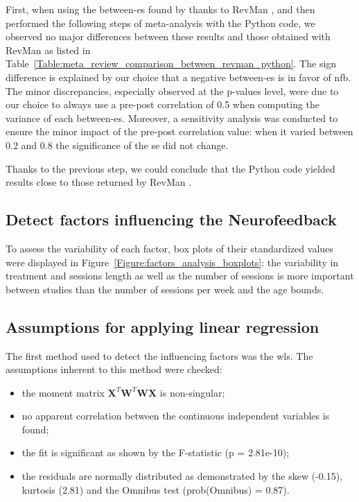 \documentclass[12pt,a4paper,english]{article}
\begin{document}
First, when using the between-\gls{es} found by \citet{Cortese2016} thanks to RevMan \citep{RevMan}, and then performed the following steps 
of meta-analysis with the Python code, we observed no major differences between these results and those obtained with RevMan \citep{RevMan} 
as listed in Table~\ref{Table:meta_review_comparison_between_revman_python}. The sign difference is explained by our choice that a negative between-\gls{es}
is in favor of \gls{nfb}. The minor discrepancies, especially observed at the p-values level,
were due to our choice to always use a pre-post correlation of 0.5 when computing the variance of each between-\gls{es}. Moreover, a sensitivity 
analysis was conducted to ensure the minor impact of the pre-post correlation value: when it varied between 0.2 and 0.8 the significance 
of the \gls{se} did not change. 

Thanks to the previous step, we could conclude that the Python code yielded results close to those returned by RevMan \citet{RevMan}.		

\subsection{Detect factors influencing the Neurofeedback}

To assess the variability of each factor, box plots of their standardized values were displayed in Figure~\ref{Figure:factors_analysis_boxplots}: 
the variability in treatment and sessions length as well as the number of sessions is more important between studies than the number of 
sessions per week and the age bounds.  

\subsection{Assumptions for applying linear regression}

The first method used to detect the influencing factors was the \gls{wls}. The assumptions inherent to this method were checked: 
\begin{itemize}
	\item the moment matrix ${\textbf{X}}^{T}\textbf{W}^{T}\textbf{WX}$ is non-singular;
  \item no apparent correlation between the continuous independent variables is found; 
  \item the fit is significant as shown by the F-statistic (p = 2.81e-10); 
  \item the residuals are normally distributed as demonstrated by the skew (-0.15), kurtosis (2.81) and the Omnibus test (prob(Omnibus) = 0.87).
\end{itemize} 
\end{document}
